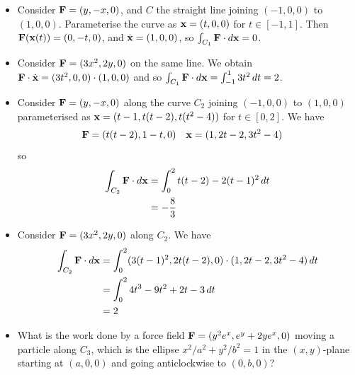 \documentclass{../../template/note}
\begin{document}
    \begin{example*}
        \begin{itemize}
            \item Consider \(\V F = (y, -x, 0)\), and \(C\) the straight line joining \((-1, 0, 0)\) to \((1, 0, 0)\). Parameterise the curve as \(\V x = (t, 0, 0)\) for \(t \in [-1, 1]\). Then \(\V F(\V x(t)) = (0, -t, 0)\), and \(\dot{\V x} = (1, 0, 0)\), so \(\int_{C_1} \V F \cdot d \V x = 0\).
            \item Consider \(\V F = (3x^2, 2y, 0)\) on the same line. We obtain \(\V F \cdot \dot{\V x} = (3t^2, 0, 0) \cdot (1, 0, 0)\) and so \(\int_{C_1} \V F \cdot d \V x = \int_{-1}^1 3t^2 \D t = 2\).
            \item Consider \(\V F = (y, -x, 0)\) along the curve \(C_2\) joining \((-1, 0, 0)\) to \((1, 0, 0)\) parameterised as \(\V x = (t-1, t(t-2), t(t^2-4))\) for \(t \in [0, 2]\). We have
            \begin{align*}
                \V F &= (t(t-2), 1-t, 0) && \V x = (1, 2t-2, 3t^2-4)
            \end{align*}
            so
            \begin{align*}
                \int_{C_2} \V F \cdot d \V x &= \int_0^2 t(t-2) - 2(t-1)^2 \D t \\
                &= -\frac 8 3
            \end{align*}
            \item Consider \(\V F = (3x^2, 2y, 0)\) along \(C_2\). We have
            \begin{align*}
                \int_{C_2} \V F \cdot d \V x &= \int_0^2 (3(t-1)^2, 2t(t-2), 0) \cdot (1, 2t-2, 3t^2-4) \D t \\
                &= \int_0^2 4t^3 - 9t^2 + 2t - 3 \D t \\
                &= 2
            \end{align*}
            \item What is the work done by a force field \(\V F = (y^2e^x, e^y + 2ye^x, 0)\) moving a particle along \(C_3\), which is the ellipse \(x^2/a^2 + y^2/b^2 = 1\) in the \((x, y)\)-plane starting at \((a, 0, 0)\) and going anticlockwise to \((0, b, 0)\)?    
            

\end{itemize}
\end{example*}
\end{document}
